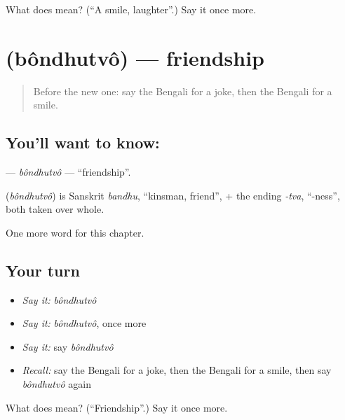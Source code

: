 \begin{tcolorbox}[breakable,colback=teal!4,colframe=teal!35!black,title={Before you move on}]
What does  mean? (\textquotedblleft{}A smile, laughter\textquotedblright{}.) Say it once more.
\end{tcolorbox}
\section[\texorpdfstring{\bn{বন্ধুত্ব} (bôndhutvô)}{বন্ধুত্ব (bôndhutvô)}]{ (bôndhutvô) — friendship}

\label{lesson:BN-C253-bondhutvo}



\begin{quote}
Before the new one: say the Bengali for a joke, then the Bengali for a smile.
\end{quote}

\subsection*{You'll want to know: }
\textbf{} — \emph{bôndhutvô} — \textquotedblleft{}friendship\textquotedblright{}.

\begin{cousinweb}
\textbf{} (\emph{bôndhutvô}) is Sanskrit \emph{bandhu}, \textquotedblleft{}kinsman, friend\textquotedblright{}, + the ending \emph{-tva}, \textquotedblleft{}-ness\textquotedblright{}, both taken over whole.
\end{cousinweb}

\begin{grammarlens}[title={What you've built}]
One more word for this chapter.
\end{grammarlens}

\subsection*{Your turn}
\begin{itemize}
\raggedright
  \item \emph{Say it:} \emph{bôndhutvô}
  \item \emph{Say it:} \emph{bôndhutvô}, once more
  \item \emph{Say it:} say \emph{bôndhutvô}
  \item \emph{Recall:} say the Bengali for a joke, then the Bengali for a smile, then say \emph{bôndhutvô} again
\end{itemize}

\begin{tcolorbox}[breakable,colback=teal!4,colframe=teal!35!black,title={Before you move on}]
What does  mean? (\textquotedblleft{}Friendship\textquotedblright{}.) Say it once more.
\end{tcolorbox}
